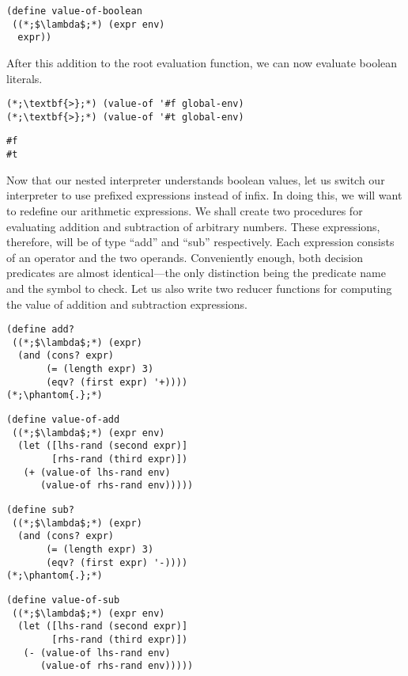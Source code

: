 \begin{cl}[]{}
\begin{lstlisting}[language=MyScheme]
(define value-of-boolean
 ((*;$\lambda$;*) (expr env)
  expr))
\end{lstlisting}
\end{cl}

After this addition to the root evaluation function, we can now evaluate boolean literals.

\begin{cloast}[]{}
\begin{lstlisting}[language=MyScheme]
(*;\textbf{>};*) (value-of '#f global-env)
(*;\textbf{>};*) (value-of '#t global-env)
\end{lstlisting}
\tcblower
\begin{lstlisting}[language=MyOutput]
#f
#t
\end{lstlisting}
\end{cloast}

Now that our nested interpreter understands boolean values, let us switch our interpreter to use prefixed expressions instead of infix. In doing this, we will want to redefine our arithmetic expressions. We shall create two procedures for evaluating addition and subtraction of arbitrary numbers. These expressions, therefore, will be of type ``add'' and ``sub'' respectively. Each expression consists of an operator and the two operands. Conveniently enough, both decision predicates are almost identical---the only distinction being the predicate name and the symbol to check. Let us also write two reducer functions for computing the value of addition and subtraction expressions. 

\begin{clrr}[]{}
\begin{lstlisting}[language=MyScheme]
(define add?
 ((*;$\lambda$;*) (expr)
  (and (cons? expr)
       (= (length expr) 3)
       (eqv? (first expr) '+))))
(*;\phantom{.};*)
\end{lstlisting}
\tcblower
\begin{lstlisting}[language=MyNLNScheme]
(define value-of-add
 ((*;$\lambda$;*) (expr env)
  (let ([lhs-rand (second expr)]
        [rhs-rand (third expr)])
   (+ (value-of lhs-rand env)
      (value-of rhs-rand env)))))
\end{lstlisting}
\end{clrr}

\begin{clrr}[]{}
\begin{lstlisting}[language=MyScheme]
(define sub?
 ((*;$\lambda$;*) (expr)
  (and (cons? expr)
       (= (length expr) 3)
       (eqv? (first expr) '-))))
(*;\phantom{.};*)
\end{lstlisting}
\tcblower
\begin{lstlisting}[language=MyNLNScheme]
(define value-of-sub
 ((*;$\lambda$;*) (expr env)
  (let ([lhs-rand (second expr)]
        [rhs-rand (third expr)])
   (- (value-of lhs-rand env)
      (value-of rhs-rand env)))))
\end{lstlisting}
\end{clrr}

